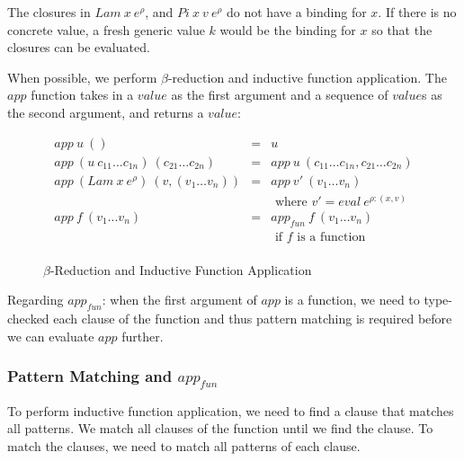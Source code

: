 The closures in $Lam \: x \: e^{\rho}$, and $Pi \: x \: v \: e^{\rho}$ do not have a
binding for $x$. If there is no concrete value, a fresh generic value $k$ would be
the binding for $x$ so that the closures can be evaluated.

When possible, we perform $\beta$-reduction and inductive function application. The $app$ function takes in a $value$ as the first argument and a sequence of
$value$s as the second argument, and returns a $value$:

\begin{figure}[H]
  \begin{equation*}
    \begin{aligned}
      app \: u \: ()                                             & = & u                                                      \\
      app \: (u \: c_{11} \dots c_{1n}) \: (c_{21} \dots c_{2n}) & = & app \: u \: (c_{11} \dots c_{1n}, c_{21} \dots c_{2n}) \\
      app \: (Lam \: x \: e^{\rho}) \: (v,(v_1 \dots v_n))       & = & app \: v' \: (v_1 \dots v_n)                           \\
                                                                 &   & \textrm{ where } v' = eval \: e^{\rho:(x,v)}           \\
      app \: f \: (v_1 ... v_n)                                  & = & app_{fun} \: f \: (v_1 \dots v_n)                      \\
                                                                 &   & \textrm{ if } f \textrm{ is a function }               \\
    \end{aligned}
  \end{equation*}
  \caption{$\beta$-Reduction and Inductive Function Application}
\end{figure}

Regarding $app_{fun}$: when the first argument of $app$ is a function, we need to type-checked each
clause of the function and thus pattern matching is required before we can evaluate $app$ further.

\subsubsection{Pattern Matching and $app_{fun}$}

To perform inductive function application, we need to find a clause that matches all patterns. We match all clauses
of the function until we find the clause. To match the clauses, we need to match all patterns of
each clause.

